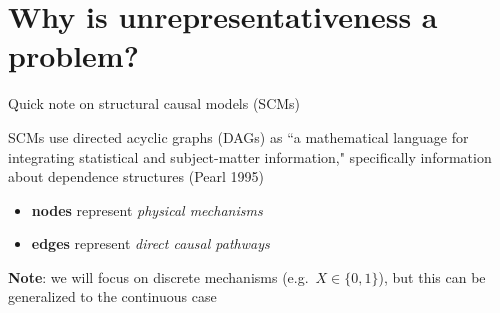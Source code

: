 \documentclass[
  ignorenonframetext,
]{beamer}
\providecommand{\tightlist}{%
  \setlength{\itemsep}{0pt}\setlength{\parskip}{0pt}}
\begin{document}
\hypertarget{why-is-unrepresentativeness-a-problem}{%
\section{Why is unrepresentativeness a
problem?}\label{why-is-unrepresentativeness-a-problem}}

\begin{frame}{Quick note on structural causal models (SCMs)}
\protect\hypertarget{quick-note-on-structural-causal-models-scms}{}

SCMs use directed acyclic graphs (DAGs) as ``a mathematical language for
integrating statistical and subject-matter information," specifically
information about dependence structures (Pearl 1995)

\begin{itemize}
\tightlist
\item
  \textbf{nodes} represent \emph{physical mechanisms}
\item
  \textbf{edges} represent \emph{direct causal pathways}
\end{itemize}

\begin{figure}
\centering
{}
\end{figure}

\textbf{Note}: we will focus on discrete mechanisms
(e.g.~\(X \in \{0,1\}\)), but this can be generalized to the continuous
case

\end{frame}
\end{document}
